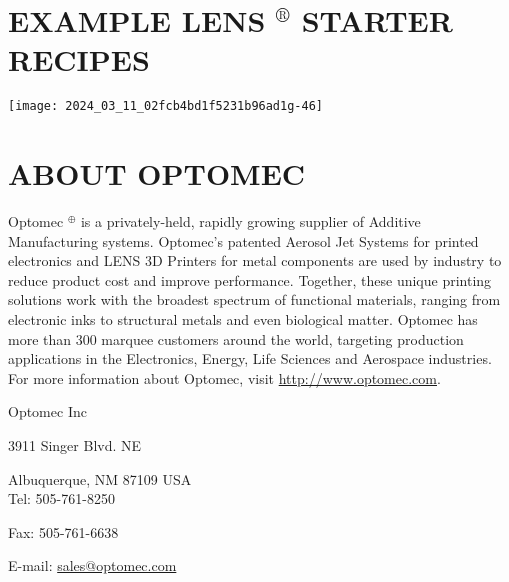 \documentclass[10pt]{article}
\begin{document}
\section*{EXAMPLE LENS ${ }^{\circledR}$ STARTER RECIPES}
\begin{center}
\texttt{[image: 2024\_03\_11\_02fcb4bd1f5231b96ad1g-46]}
\end{center}

\section*{ABOUT OPTOMEC}
Optomec ${ }^{\oplus}$ is a privately-held, rapidly growing supplier of Additive Manufacturing systems. Optomec's patented Aerosol Jet Systems for printed electronics and LENS 3D Printers for metal components are used by industry to reduce product cost and improve performance. Together, these unique printing solutions work with the broadest spectrum of functional materials, ranging from electronic inks to structural metals and even biological matter. Optomec has more than 300 marquee customers around the world, targeting production applications in the Electronics, Energy, Life Sciences and Aerospace industries. For more information about Optomec, visit \href{http://www.optomec.com}{http://www.optomec.com}.

Optomec Inc

3911 Singer Blvd. NE

Albuquerque, NM 87109 USA\\
Tel: 505-761-8250

Fax: 505-761-6638

E-mail: \href{mailto:sales@optomec.com}{sales@optomec.com}
\end{document}
